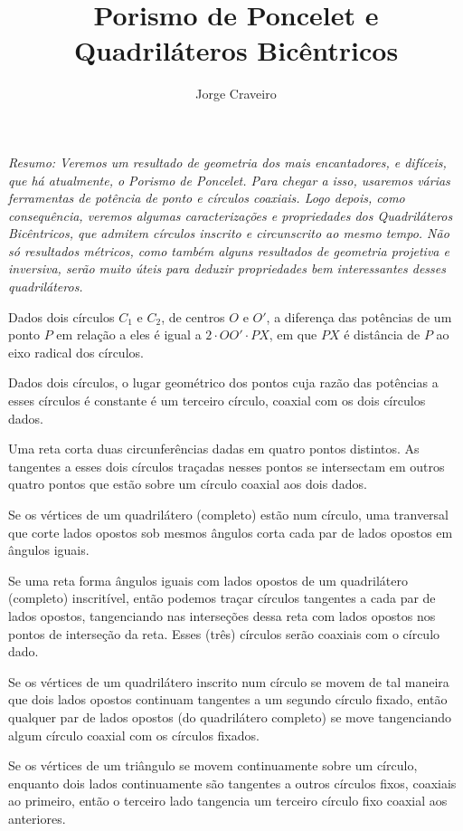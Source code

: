 \documentclass[10pt, a4paper]{article}
\title{Porismo de Poncelet e Quadriláteros Bicêntricos}
\author{Jorge Craveiro}
\begin{document}
	
	\zeustitle
	\begin{center}
		\begin{minipage}{0.8\textwidth}
			\itshape Resumo: Veremos um resultado de geometria dos mais encantadores, e difíceis, que há atualmente, o Porismo de Poncelet. Para chegar a isso, usaremos várias ferramentas de potência de ponto e círculos coaxiais. Logo depois, como consequência, veremos algumas caracterizações e propriedades dos Quadriláteros Bicêntricos, que admitem círculos inscrito e circunscrito ao mesmo tempo. Não só resultados métricos, como também alguns resultados de geometria projetiva e inversiva, serão muito úteis para deduzir propriedades bem interessantes desses quadriláteros.
		\end{minipage}
	\end{center}
	\begin{prob}
		Dados dois círculos $C_1$ e $C_2$, de centros $O$ e $O'$, a diferença das potências de um ponto $P$ em relação a eles é igual a $2 \cdot OO' \cdot PX$, em que $PX$ é distância de $P$ ao eixo radical dos círculos.
	\end{prob}
	\begin{prob}
		Dados dois círculos, o lugar geométrico dos pontos cuja razão das potências a esses círculos é constante é um terceiro círculo, coaxial com os dois círculos dados.
	\end{prob}
	\begin{prob}
		Uma reta corta duas circunferências dadas em quatro pontos distintos. As tangentes a esses dois círculos traçadas nesses pontos se intersectam em outros quatro pontos que estão sobre um círculo coaxial aos dois dados.
	\end{prob}
	\begin{prob}
		Se os vértices de um quadrilátero (completo) estão num círculo, uma tranversal que corte lados opostos sob mesmos ângulos corta cada par de lados opostos em ângulos iguais.
	\end{prob}
	\begin{prob}
		Se uma reta forma ângulos iguais com lados opostos de um quadrilátero (completo) inscritível, então podemos traçar círculos tangentes a cada par de lados opostos, tangenciando nas interseções dessa reta com lados opostos nos pontos de interseção da reta. Esses (três) círculos serão coaxiais com o círculo dado.
	\end{prob}
	\begin{prob}
		Se os vértices de um quadrilátero inscrito num círculo se movem de tal maneira que dois lados opostos continuam tangentes a um segundo círculo fixado, então qualquer par de lados opostos (do quadrilátero completo) se move tangenciando algum círculo coaxial com os círculos fixados.
	\end{prob}
	\begin{prob}
		Se os vértices de um triângulo se movem continuamente sobre um círculo, enquanto dois lados continuamente são tangentes a outros círculos fixos, coaxiais ao primeiro, então o terceiro lado tangencia um terceiro círculo fixo coaxial aos anteriores.
	\end{prob}
\end{document}
